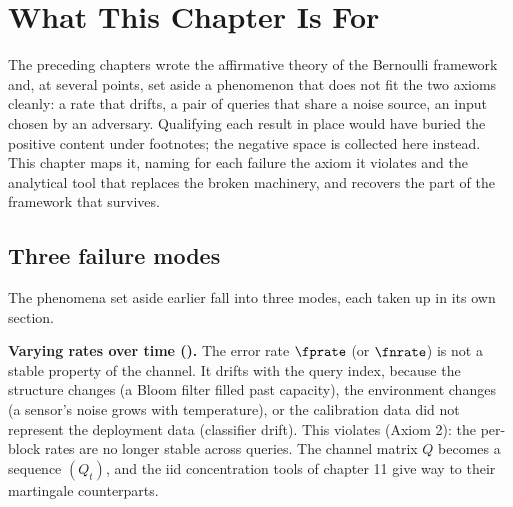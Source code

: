 %

\section{What This Chapter Is For}
\label{sec:what-this-chapter-is-for}

The preceding chapters wrote the affirmative theory of the Bernoulli
framework and, at several points, set aside a phenomenon that does not
fit the two axioms cleanly: a rate that drifts, a pair of queries that
share a noise source, an input chosen by an adversary. Qualifying each
result in place would have buried the positive content under footnotes;
the negative space is collected here instead. This chapter maps it,
naming for each failure the axiom it violates and the analytical tool
that replaces the broken machinery, and 
recovers the part of the framework that survives.

\subsection*{Three failure modes}

The phenomena set aside earlier fall into three modes, each taken up in
its own section.

\textbf{Varying rates over time ().} The error
rate $\fprate$ (or $\fnrate$) is not a stable property of the channel. It
drifts with the query index, because the structure changes (a Bloom
filter filled past capacity), the environment changes (a sensor's noise
grows with temperature), or the calibration data did not represent the
deployment data (classifier drift). This violates
 (Axiom 2): the per-block rates are no longer
stable across queries. The channel matrix $Q$ becomes a sequence $(Q_t)$,
and the iid concentration tools of chapter 11 give way to their
martingale counterparts.

